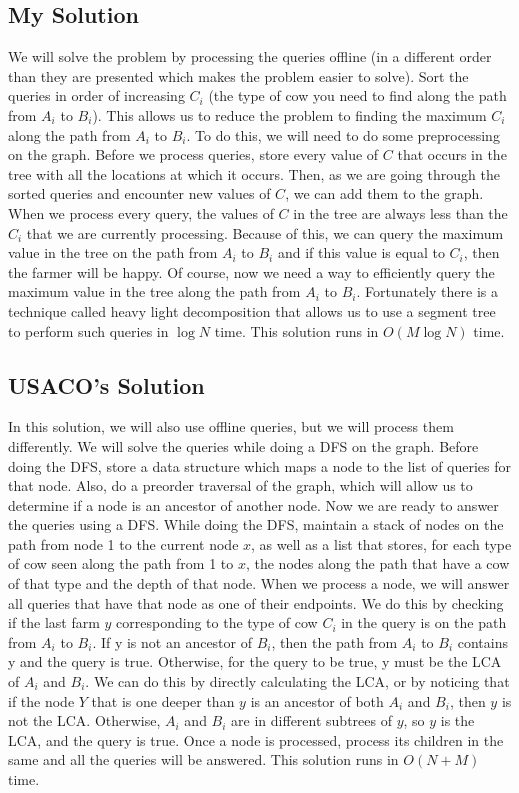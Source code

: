 \documentclass{article}
\begin{document}
\subsection{My Solution}
We will solve the problem by processing the queries offline (in a different order than they are presented which makes the problem easier to solve). Sort the queries in order of increasing $C_i$ (the type of cow you need to find along the path from $A_i$ to $B_i$). This allows us to reduce the problem to finding the maximum $C_i$ along the path from $A_i$ to $B_i$. To do this, we will need to do some preprocessing on the graph. Before we process queries, store every value of $C$ that occurs in the tree with all the locations at which it occurs. Then, as we are going through the sorted queries and encounter new values of $C$, we can add them to the graph. When we process every query, the values of $C$ in the tree are always less than the $C_i$ that we are currently processing. Because of this, we can query the maximum value in the tree on the path from $A_i$ to $B_i$ and if this value is equal to $C_i$, then the farmer will be happy.
\newline
\newline
Of course, now we need a way to efficiently query the maximum value in the tree along the path from $A_i$ to $B_i$. Fortunately there is a technique called heavy light decomposition that allows us to use a segment tree to perform such queries in $\log N$ time. This solution runs in $O(M\log N)$ time.
\subsection{USACO's Solution}
In this solution, we will also use offline queries, but we will process them differently. We will solve the queries while doing a DFS on the graph. Before doing the DFS, store a data structure which maps a node to the list of queries for that node. Also, do a preorder traversal of the graph, which will allow us to determine if a node is an ancestor of another node. Now we are ready to answer the queries using a DFS.
\newline
\newline
While doing the DFS, maintain a stack of nodes on the path from node 1 to the current node $x$, as well as a list that stores, for each type of cow seen along the path from 1 to $x$, the nodes along the path that have a cow of that type and the depth of that node. When we process a node, we will answer all queries that have that node as one of their endpoints. We do this by checking if the last farm $y$ corresponding to the type of cow $C_i$ in the query is on the path from $A_i$ to $B_i$. If y is not an ancestor of $B_i$, then the path from $A_i$ to $B_i$ contains y and the query is true. Otherwise, for the query to be true, y must be the LCA of $A_i$ and $B_i$. We can do this by directly calculating the LCA, or by noticing that if the node $Y$ that is one deeper than $y$ is an ancestor of both $A_i$ and $B_i$, then $y$ is not the LCA. Otherwise, $A_i$ and $B_i$ are in different subtrees of $y$, so $y$ is the LCA, and the query is true. Once a node is processed, process its children in the same and all the queries will be answered. This solution runs in $O(N + M)$ time.
\end{document}
